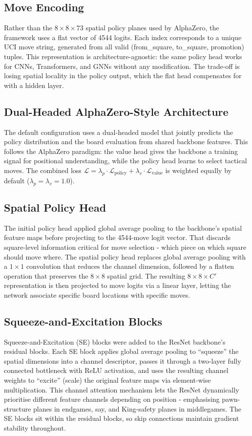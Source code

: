 \subsection{Move Encoding}
Rather than the $8 \times 8 \times 73$ spatial policy planes used by AlphaZero, the framework uses a flat vector of 4544 logits. Each index corresponds to a unique UCI move string, generated from all valid (from\_square, to\_square, promotion) tuples. This representation is architecture-agnostic: the same policy head works for CNNs, Transformers, and GNNs without any modification. The trade-off is losing spatial locality in the policy output, which the flat head compensates for with a hidden layer.

\subsection{Dual-Headed AlphaZero-Style Architecture}
The default configuration uses a dual-headed model that jointly predicts the policy distribution and the board evaluation from shared backbone features. This follows the AlphaZero paradigm: the value head gives the backbone a training signal for positional understanding, while the policy head learns to select tactical moves. The combined loss $\mathcal{L} = \lambda_p \cdot \mathcal{L}_{\text{policy}} + \lambda_v \cdot \mathcal{L}_{\text{value}}$ is weighted equally by default ($\lambda_p = \lambda_v = 1.0$).

\subsection{Spatial Policy Head}
The initial policy head applied global average pooling to the backbone's spatial feature maps before projecting to the 4544-move logit vector. That discards square-level information critical for move selection - which piece on which square should move where. The spatial policy head replaces global average pooling with a $1 \times 1$ convolution that reduces the channel dimension, followed by a flatten operation that preserves the $8 \times 8$ spatial grid. The resulting $8 \times 8 \times C'$ representation is then projected to move logits via a linear layer, letting the network associate specific board locations with specific moves.

\subsection{Squeeze-and-Excitation Blocks}
Squeeze-and-Excitation (SE) \cite{se} blocks were added to the ResNet backbone's residual blocks. Each SE block applies global average pooling to ``squeeze'' the spatial dimensions into a channel descriptor, passes it through a two-layer fully connected bottleneck with ReLU activation, and uses the resulting channel weights to ``excite'' (scale) the original feature maps via element-wise multiplication. This channel attention mechanism lets the ResNet dynamically prioritise different feature channels depending on position - emphasising pawn-structure planes in endgames, say, and King-safety planes in middlegames. The SE blocks sit within the residual blocks, so skip connections maintain gradient stability throughout.

